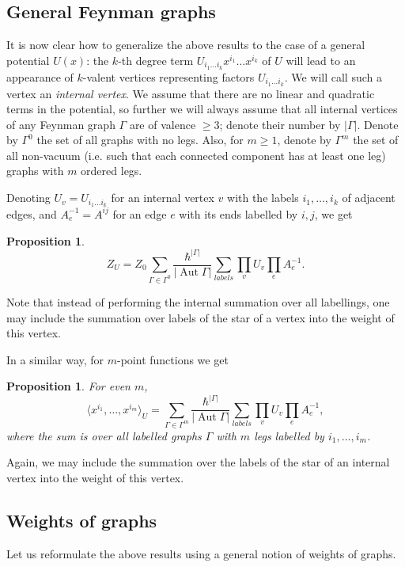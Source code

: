 \documentclass[10pt]{amsart}
\newtheorem{prop}[thm]{Proposition}
\theoremstyle{definition}
\theoremstyle{remark}
\def\<{\langle}
\def\>{\rangle}
\newcommand{\h}{\hbar}
\newcommand{\GG}{\Gamma}
\newcommand{\Aut}{\operatorname{Aut}}
\begin{document}
\subsection{General Feynman graphs}
It is now clear how to generalize the above results to the case of
a general potential $U(x)$: the $k$-th degree term $U_{i_1\dots
i_k}x^{i_1}\dots x^{i_k}$ of $U$ will lead to an appearance of
$k$-valent vertices representing factors $U_{i_1\dots i_k}$. We
will call such a vertex an {\em internal vertex}. We assume that
there are no linear and quadratic terms in the potential, so
further we will always assume that all internal vertices of any
Feynman graph $\GG$ are of valence $\ge 3$; denote their number by
$|\GG|$. Denote by $\GG^0$ the set of all graphs with no legs.
Also, for $m\ge1$, denote by $\GG^m$ the set of all non-vacuum
(i.e. such that each connected component has at least one leg)
graphs with $m$ ordered legs.

Denoting $U_v=U_{i_1\dots i_k}$ for an internal vertex $v$ with
the labels $i_1,\dots,i_k$ of adjacent edges, and
$A^{-1}_e=A^{ij}$ for an edge $e$ with its ends labelled by $i,j$,
we get
\begin{prop}
\begin{equation}
\label{eq:ZU} Z_U=Z_0\sum_{\GG\in\GG^0}\frac{\h^{|\GG|}}{|\Aut
\GG|}\sum_{labels} \prod_{v} U_v \prod_{e} A^{-1}_e .
\end{equation}
\end{prop}
Note that instead of performing the internal summation over all
labellings, one may include the summation over labels of the star
of a vertex into the weight of this vertex.

In a similar way, for $m$-point functions we get
\begin{prop} For even $m$,
\begin{equation}
\label{eq:corr}
\<x^{i_1},\dots,x^{i_m}\>_U=\sum_{\GG\in\GG^m}\frac{\h^{|\GG|}}
{|\Aut \GG|}\sum_{labels}\prod_{v} U_v\prod_{e}A^{-1}_e ,
\end{equation}
where the sum is over all labelled graphs $\GG$ with $m$ legs
labelled by $i_1,\dots,i_m$.
\end{prop}
Again, we may include the summation over the labels of the star of
an internal vertex into the weight of this vertex.

\subsection{Weights of graphs}
Let us reformulate the above results using a general notion of
weights of graphs.
\end{document}
